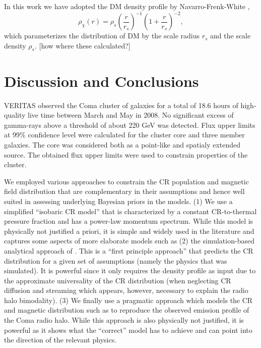 \documentclass[12pt,manuscript]{aastex}
\newcommand{\expval}[1]{\left\langle #1 \right\rangle}
\begin{document}
In this work we have adopted the DM density profile by Navarro-Frenk-White \citep[NFW;][]{article:NavarroFrenkWhite:1997},
\begin{equation}
\rho_{\chi}(r)=\rho_{s}\left(\frac{r}{r_{s}}\right)^{-1}\left(1+\frac{r}{r_{s}}\right)^{-2},
\end{equation} 
which parameterizes the distribution of DM by the scale radius $r_{s}$ and the scale density $\rho_{s}$. [how where these calculated?]


\section{Discussion and Conclusions}
VERITAS observed the Coma cluster of galaxies for a total of 18.6 hours of high-quality live time between March and May in 2008. No significant excess of gamma-rays above a threshold of about 220 GeV was detected. Flux upper limits at 99\% confidence level were calculated for the cluster core and three member galaxies. The core was considered both as a point-like and spatialy extended source. The obtained flux upper limits were used to constrain properties of the cluster.

We employed various approaches to constrain the CR population and magnetic field distribution that are complementary in their assumptions and hence well suited in assessing underlying Bayesian priors in the models. (1) We use a simplified ``isobaric CR model'' that is characterized by a constant CR-to-thermal pressure fraction and has a power-law momentum spectrum.  While this model is physically not justified a priori, it is simple and widely used in the literature and captures some aspects of more elaborate models such as (2) the simulation-based analytical approach of \citet{article:PinzkePfrommer:2010}. This is a ``first principle approach'' that predicts the CR distribution for a given set of assumptions (namely the physics that was simulated). It is powerful since it only requires the density profile as input due to the approximate universality of the CR distribution (when neglecting CR diffusion and streaming which appears, however, necessary to explain the radio halo bimodality). (3) We finally use a pragmatic approach which models the CR and magnetic distribution such as to reproduce the observed emission profile of the Coma radio halo. While this approach is also physically not justified, it is powerful as it shows what the ``correct'' model has to achieve and can point into the direction of the relevant physics.
\end{document}
